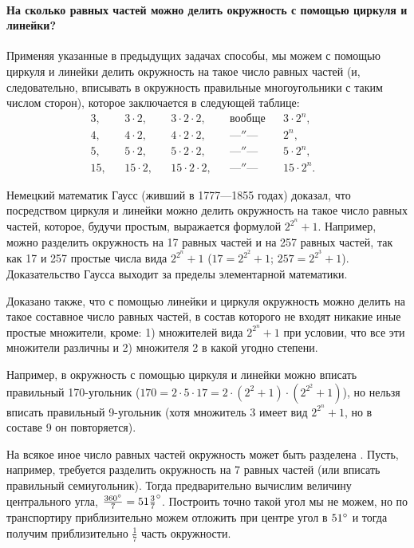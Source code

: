 \documentclass[oneside]{book}
\begin{document}
\paragraph{На сколько равных частей можно делить окружность с помощью циркуля и линейки?}\label{1938/225}
Применяя указанные в предыдущих задачах способы, мы можем с помощью циркуля и линейки делить окружность на такое число равных частей (и, следовательно, вписывать в окружность правильные многоугольники с таким числом сторон), которое заключается в следующей таблице:
\begin{align*}
3,&&3\cdot 2,&&3\cdot2\cdot2,&&\text{вообще}&&3\cdot 2^n,&
\\
4,&&4\cdot 2,&&4\cdot2\cdot2,&&\text{—″—\ \ }&&2^n,&
\\
5,&&5\cdot 2,&&5\cdot2\cdot2,&&\text{—″—\ \ }&&5\cdot 2^n,&
\\
15,&&15\cdot 2,&&15\cdot2\cdot2,&&\text{—″—\ \ }&&15\cdot 2^n.&
\end{align*}

Немецкий математик Гаусс (живший в 1777—1855 годах) доказал, что посредством циркуля и линейки можно делить окружность на такое число равных частей, которое, будучи простым, выражается формулой $2^{2^n} + 1$.
Например, можно разделить окружность на 17 равных частей и на 257 равных частей, так как 17 и 257 простые числа вида $2^{2^n} + 1$ 
($17 = 2^{2^2} + 1$;
$257 = 2^{2^3} + 1$).
Доказательство Гаусса выходит за пределы элементарной математики.

Доказано также, что с помощью линейки и циркуля окружность можно делить на такое составное число равных частей, в состав которого не входят никакие иные простые множители, кроме:
1) множителей вида $2^{2^n} + 1$ при условии, что все эти множители различны 
и 
2) множителя 2 в какой угодно степени.

Например, в окружность с помощью циркуля и линейки можно вписать правильный 170-угольник ($170 = 2 \cdot 5 \cdot 17 = 2 \cdot (2^2 + 1) \cdot (2^{2^2} +1)$),
но нельзя вписать правильный 9-угольник (хотя множитель 3 имеет вид $2^{2^n} + 1$, но в составе 9 он повторяется).

На всякое иное число равных частей окружность может быть разделена .
Пусть, например, требуется разделить окружность на 7 равных частей (или вписать правильный семиугольник).
Тогда предварительно вычислим величину центрального угла,
$\frac{360\degree}7=51\tfrac37\degree$.
Построить точно такой угол мы не можем, но по транспортиру приблизительно можем отложить при центре угол в $51\degree$ и тогда получим приблизительно $\tfrac17$ часть окружности.
\end{document}
